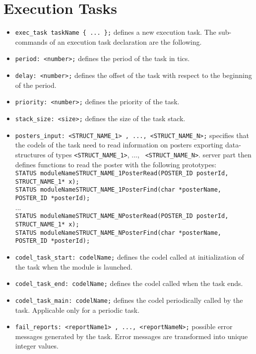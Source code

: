 \section{Execution Tasks}
\label{sec|exec-task}

\begin{itemize}
\item[]{\tt exec\_task taskName \{ ... \};} defines a new execution task. The
sub-commands of an execution task declaration are the following.

\item[]{\tt period:  <number>;} defines the period of the task in tics.

\item[]{\tt delay:  <number>;} defines the offset of the task with respect to
the beginning of the period.

\item[]{\tt priority:  <number>;} defines the priority of the task.

\item[]{\tt stack\_size:  <size>;} defines the size of the task stack.

\item[]{\tt posters\_input:  <STRUCT\_NAME\_1> , ..., <STRUCT\_NAME\_N>;}
specifies that the codels of the task need to read information on posters exporting
data-structures of types {\tt <STRUCT\_NAME\_1>}, ..., {\tt
  <STRUCT\_NAME\_N>}. {\GenoM} server part then defines functions to read
the poster with the following prototypes:\\ {\small
{\tt STATUS moduleNameSTRUCT\_NAME\_1PosterRead(POSTER\_ID posterId,
  STRUCT\_NAME\_1* x);}\\
{\tt STATUS moduleNameSTRUCT\_NAME\_1PosterFind(char *posterName,
  POSTER\_ID *posterId);}\\
...\\
{\tt STATUS moduleNameSTRUCT\_NAME\_NPosterRead(POSTER\_ID posterId,
  STRUCT\_NAME\_1* x);}\\
{\tt STATUS moduleNameSTRUCT\_NAME\_NPosterFind(char *posterName,
  POSTER\_ID *posterId);}\\
}

\item[]{\tt codel\_task\_start:  codelName;} defines the codel called at
initialization of the task when the module is launched.

\item[]{\tt codel\_task\_end:  codelName;} defines the codel called when the task ends.

\item[]{\tt codel\_task\_main:  codelName;} defines the codel periodically
called by the task. Applicable only for a periodic task.

\item[]{\tt fail\_reports:  <reportName1> , ..., <reportNameN>;} 
possible error messages generated by the task. Error messages are
transformed into unique integer values.
\end{itemize}
